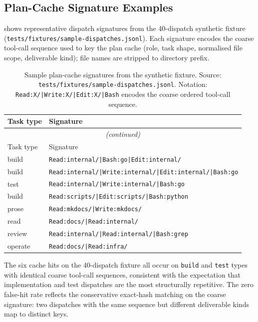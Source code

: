 \subsection{Plan-Cache Signature Examples}
\label{sec:plancache-examples}

 shows representative dispatch signatures
from the 40-dispatch synthetic fixture
(\texttt{tests/fixtures/\allowbreak{}sample-dispatches.jsonl}).
Each signature encodes the coarse tool-call sequence used to
key the plan cache (role, task shape, normalised file scope,
deliverable kind); file names are stripped to directory prefix.

\begin{longtable}{lp{10cm}}
\caption{Sample plan-cache signatures from the synthetic fixture.
  Source: \texttt{tests/fixtures/\allowbreak{}sample-dispatches.jsonl}.
  Notation: \texttt{Read:X/|Write:X/|Edit:X/|Bash} encodes the
  coarse ordered tool-call sequence.}
\label{tab:plancache-sigs} \\
\toprule
Task type & Signature \\
\midrule
\endfirsthead
\multicolumn{2}{c}{\textit{(continued)}} \\
\toprule
Task type & Signature \\
\midrule
\endhead
\bottomrule
\endlastfoot
build  & \footnotesize\texttt{Read:internal/|Bash:go|Edit:internal/} \\
build  & \footnotesize\texttt{Read:internal/|Write:internal/|Edit:internal/|Bash:go} \\
test   & \footnotesize\texttt{Read:internal/|Write:internal/|Bash:go} \\
build  & \footnotesize\texttt{Read:scripts/|Edit:scripts/|Bash:python} \\
prose  & \footnotesize\texttt{Read:mkdocs/|Write:mkdocs/} \\
read   & \footnotesize\texttt{Read:docs/|Read:internal/} \\
review & \footnotesize\texttt{Read:internal/|Read:internal/|Bash:grep} \\
operate & \footnotesize\texttt{Read:docs/|Read:infra/} \\
\end{longtable}

The six cache hits on the 40-dispatch fixture all occur on \texttt{build}
and \texttt{test} types with identical coarse tool-call sequences,
consistent with the expectation that implementation and test dispatches
are the most structurally repetitive.
The zero false-hit rate reflects the conservative exact-hash matching
on the coarse signature: two dispatches with the same sequence but
different deliverable kinds map to distinct keys.

